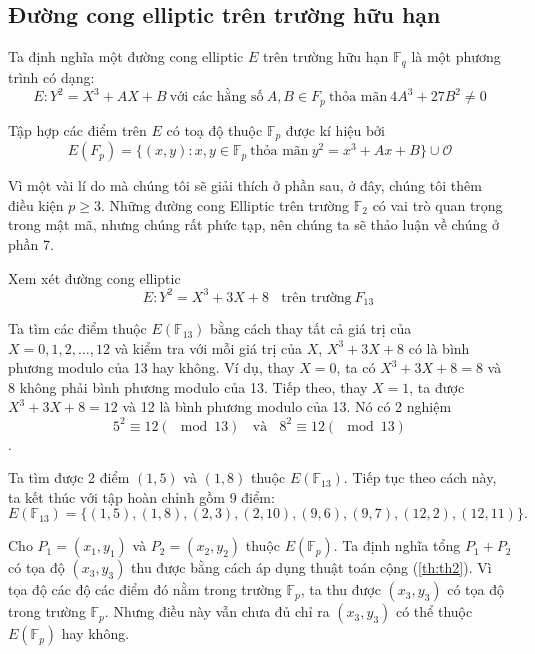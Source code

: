 \subsection{Đường cong elliptic trên trường hữu hạn}

Ta định nghĩa một đường cong elliptic $E$ trên trường hữu hạn $\mathbb{F}_q$ là một phương trình có dạng:
$$E: Y^2 = X^3 + AX + B\ \text{với các hằng số}\ A, B \in F_p\ \text{thỏa mãn}\ 4A^3 + 27B^2 \neq 0$$


Tập hợp các điểm trên $E$ có toạ độ thuộc $\mathbb{F} _p$ được kí hiệu bởi
$$E(F_p) = \{(x, y) : x, y \in \mathbb{F}_p\ \text{thỏa mãn}\ y^2 = x^3 + A x + B\} \cup \mathcal{O}$$

\begin{remark}
	Vì một vài lí do mà chúng tôi sẽ giải thích ở phần sau, ở đây, chúng tôi thêm điều kiện $p \geq 3$.
	Những đường cong Elliptic trên trường $\mathbb{F}_2$ có vai trò quan trọng trong mật mã, nhưng chúng rất phức tạp, nên chúng ta sẽ thảo luận về chúng ở phần 7.
\end{remark}

\begin{example}
	\label{ex:ex4}
	Xem xét đường cong elliptic
	$$E: Y^2 = X^3 + 3X + 8 \ \ \ \ \text{trên trường}\  F_{13}\ $$
\end{example}

Ta tìm các điểm thuộc $E(\mathbb{F}_{13})$ bằng cách thay tất cả giá trị của $X = 0,1,2,\ldots,12$ và kiểm tra với mỗi giá trị của $X$, $X^3 + 3X + 8$ có là bình phương modulo của 13 hay không.
Ví dụ, thay $X = 0$, ta có $X^3+3X+8 = 8$ và 8 không phải bình phương modulo của 13.
Tiếp theo, thay $X = 1$, ta được $X^3+3X+8 = 12$ và 12 là bình phương modulo của 13. Nó có 2 nghiệm
$$5^2 \equiv 12 (\mod{13}) \ \ \ \ \text{và} \ \ \ \ 8^2 \equiv 12 (\mod 13)$$.

Ta tìm được 2 điểm $(1,5)$ và $(1,8)$ thuộc $E(\mathbb{F}_{13})$. Tiếp tục theo cách này, ta kết thúc với tập hoàn chỉnh gồm 9 điểm:
$$E(\mathbb{F}_{13}) = \{(1,5), (1,8), (2,3), (2,10), (9,6), (9,7), (12,2), (12,11)\}.$$

Cho $P_1 = (x_1, y_1)$ và $P_2 = (x_2, y_2)$ thuộc $E(\mathbb{F}_{p})$. Ta định nghĩa tổng $P_1+P_2$ có tọa độ $(x_3, y_3)$ thu được bằng cách áp dụng thuật toán cộng (\ref{th:th2}).
Vì tọa độ các độ các điểm đó nằm trong trường $\mathbb{F}_p$, ta thu được $(x_3, y_3)$ có tọa độ trong trường $\mathbb{F}_p$. Nhưng điều này vẫn chưa đủ chỉ ra
$(x_3, y_3)$ có thể thuộc $E(\mathbb{F}_{p})$ hay không.

